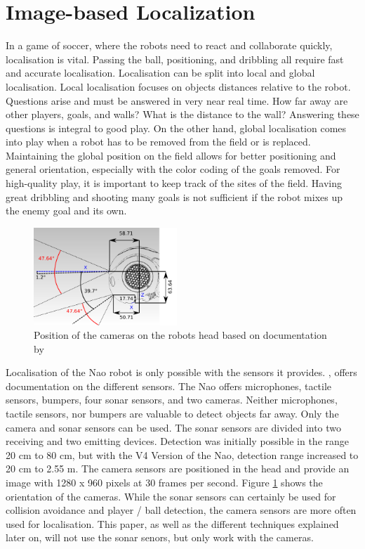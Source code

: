 \documentclass[12pt, a4paper, doc]{apa6}
\begin{document}
  \section{Image-based Localization}
  In a game of soccer, where the robots need to react and collaborate quickly, localisation is vital. Passing the ball, positioning, and dribbling all require fast and accurate localisation. Localisation can be split into local and global localisation. Local localisation focuses on objects distances relative to the robot. Questions arise and must be answered in very near real time. How far away are other players, goals, and walls? What is the distance to the wall? Answering these questions is integral to good play. On the other hand, global localisation comes into play when a robot has to be removed from the field or is replaced. Maintaining the global position on the field allows for better positioning and general orientation, especially with the color coding of the goals removed. For high-quality play, it is important to keep track of the sites of the field. Having great dribbling and shooting many goals is not sufficient if the robot mixes up the enemy goal and its own.

  \begin{figure}
    \begin{center}
      \includegraphics[width=0.48\textwidth]{eyes.png}
    \end{center}
    \caption{Position of the cameras on the robots head based on documentation by \cite{naosheet}}
    \label{eyes}
  \end{figure}

  Localisation of the Nao robot is only possible with the sensors it provides. \cite{naosheet}, offers documentation on the different sensors. The Nao offers microphones, tactile sensors, bumpers, four sonar sensors, and two cameras. Neither microphones, tactile sensors, nor bumpers are valuable to detect objects far away. Only the camera and sonar sensors can be used. The sonar sensors are divided into two receiving and two emitting devices. Detection was initially possible in the range 20 cm to 80 cm, but with the V4 Version of the Nao, detection range increased to 20 cm to 2.55 m. The camera sensors are positioned in the head and provide an image with 1280 x 960 pixels at 30 frames per second. Figure \ref{eyes} shows the orientation of the cameras. While the sonar sensors can certainly be used for collision avoidance and player / ball detection, the camera sensors are more often used for localisation. This paper, as well as the different techniques explained later on, will not use the sonar senors, but only work with the cameras.
\end{document}
